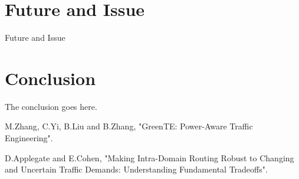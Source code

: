 \documentclass[conference]{IEEEtran}
\begin{document}
\section{Future and Issue}
Future and Issue


\section{Conclusion}
The conclusion goes here.

\begin{thebibliography}{1}

M.Zhang, C.Yi, B.Liu and B.Zhang, "GreenTE: Power-Aware Traffic Engineering".

D.Applegate and E.Cohen, "Making Intra-Domain Routing Robust to Changing and Uncertain Traffic Demands: Understanding Fundamental Tradeoffs".

\end{thebibliography}


\end{document}
